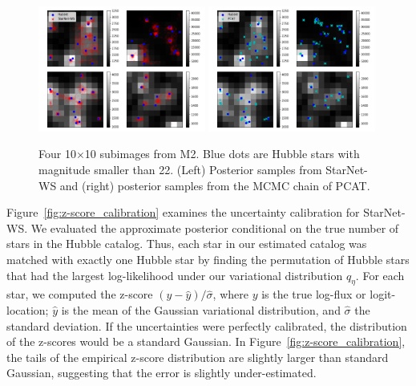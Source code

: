 \begin{figure}[H]
    \centering
    \includegraphics[width=0.49\textwidth]{figures/example_subimages_samples_ws.png}
    \includegraphics[width=0.49\textwidth]{figures/example_subimages_samples_pcat.png}
    \caption{Four 10$\times$10 subimages from
    M2. Blue dots are Hubble stars with magnitude smaller than 22. (Left) Posterior samples from StarNet-WS and (right) posterior samples from the MCMC chain of PCAT. }
    \label{fig:example_subimages_sampled}
\end{figure}

Figure~\ref{fig:z-score_calibration} examines the uncertainty calibration for StarNet-WS. 
We evaluated the approximate posterior 
conditional on the true number of stars in the Hubble catalog. 
Thus, each star in our estimated catalog was matched with exactly one Hubble star by finding the permutation of Hubble stars that had the largest log-likelihood under our variational distribution $q_\eta$. 
For each star, we computed the z-score $(y - \hat y) / \hat \sigma$, where $y$ is the true log-flux or 
logit-location; $\hat y$ is the mean of the Gaussian variational distribution, and $\hat\sigma$ the standard deviation.
If the uncertainties were perfectly calibrated, the distribution of the z-scores would be a standard Gaussian. 
In Figure~\ref{fig:z-score_calibration}, the tails of the empirical z-score distribution are slightly larger than standard Gaussian, suggesting that the error is slightly under-estimated. 

